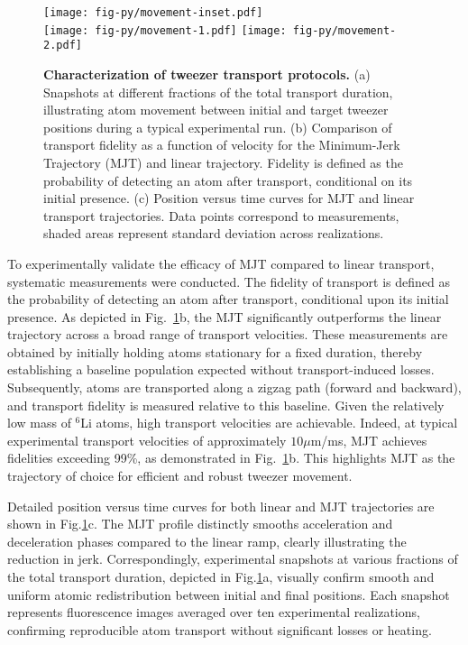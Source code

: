 \begin{figure}
\centering
{}
\texttt{[image: fig-py/movement-inset.pdf]} \\
\texttt{[image: fig-py/movement-1.pdf]}
\hspace{1cm}
\texttt{[image: fig-py/movement-2.pdf]}
\caption[Characterization of tweezer transport protocols]{
\textbf{Characterization of tweezer transport protocols.}
(a) Snapshots at different fractions of the total transport duration, illustrating atom movement between initial and target tweezer positions during a typical experimental run.
(b) Comparison of transport fidelity as a function of velocity for the Minimum-Jerk Trajectory (MJT) and linear trajectory. Fidelity is defined as the probability of detecting an atom after transport, conditional on its initial presence.
(c) Position versus time curves for MJT and linear transport trajectories.
Data points correspond to measurements, shaded areas represent standard deviation across realizations.
}
\label{fig:movement}
\end{figure}


To experimentally validate the efficacy of MJT compared to linear transport, systematic measurements were conducted. The fidelity of transport is defined as the probability of detecting an atom after transport, conditional upon its initial presence. As depicted in Fig.~\ref{fig:movement}b, the MJT significantly outperforms the linear trajectory across a broad range of transport velocities. These measurements are obtained by initially holding atoms stationary for a fixed duration, thereby establishing a baseline population expected without transport-induced losses. Subsequently, atoms are transported along a zigzag path (forward and backward), and transport fidelity is measured relative to this baseline. Given the relatively low mass of $^6$Li atoms, high transport velocities are achievable. Indeed, at typical experimental transport velocities of approximately $10\mu$m/ms, MJT achieves fidelities exceeding 99\%, as demonstrated in Fig.~\ref{fig:movement}b. This highlights MJT as the trajectory of choice for efficient and robust tweezer movement.

Detailed position versus time curves for both linear and MJT trajectories are shown in Fig.\ref{fig:movement}c. The MJT profile distinctly smooths acceleration and deceleration phases compared to the linear ramp, clearly illustrating the reduction in jerk. Correspondingly, experimental snapshots at various fractions of the total transport duration, depicted in Fig.\ref{fig:movement}a, visually confirm smooth and uniform atomic redistribution between initial and final positions. Each snapshot represents fluorescence images averaged over ten experimental realizations, confirming reproducible atom transport without significant losses or heating.


